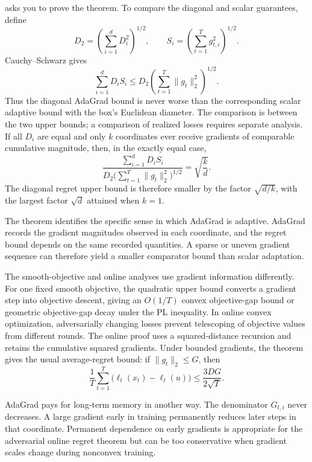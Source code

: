 \documentclass[11pt,twoside]{article}
\theoremstyle{definition}
\theoremstyle{remark}
\begin{document}
 asks you to prove the theorem. To compare the
diagonal and scalar guarantees, define
\[
 D_2=\left(\sum_{i=1}^dD_i^2\right)^{1/2},
 \qquad
 S_i=\left(\sum_{t=1}^Tg_{t,i}^2\right)^{1/2}.
\]
Cauchy--Schwarz gives
\begin{equation}
 \sum_{i=1}^dD_iS_i
 \le D_2\left(\sum_{t=1}^T\|g_t\|_2^2\right)^{1/2}.
 \label{eq:diagonal-versus-scalar}
\end{equation}
Thus the diagonal AdaGrad bound is never worse than the corresponding scalar
adaptive bound with the box's Euclidean diameter. The comparison is between
the two upper bounds; a comparison of realized losses requires separate
analysis. If all
$D_i$ are equal and only $k$ coordinates ever receive gradients of comparable
cumulative magnitude, then, in the exactly equal case,
\begin{equation}
 \frac{\sum_{i=1}^dD_iS_i}
 {D_2\bigl(\sum_{t=1}^T\|g_t\|_2^2\bigr)^{1/2}}
 =\sqrt{\frac{k}{d}}.
 \label{eq:adagrad-sparse-gain}
\end{equation}
The diagonal regret upper bound is therefore smaller by the factor
$\sqrt{d/k}$, with the largest factor $\sqrt d$ attained when $k=1$.

The theorem identifies the specific sense in which AdaGrad is adaptive.
AdaGrad records the gradient magnitudes observed in each coordinate, and the
regret bound depends on the same recorded quantities. A sparse or uneven
gradient sequence can therefore yield a smaller comparator bound than scalar
adaptation.

The smooth-objective and online analyses use gradient information
differently. For one fixed smooth objective, the quadratic upper bound
converts a gradient step into objective descent, giving an $O(1/T)$ convex
objective-gap bound or geometric objective-gap decay under the PL inequality.
In online convex optimization, adversarially changing losses prevent
telescoping of objective values from different rounds. The online proof uses a
squared-distance recursion and retains the cumulative squared gradients.
Under bounded gradients, the
theorem gives the usual average-regret bound: if $\|g_t\|_2\le G$, then
\begin{equation}
 \frac1T\sum_{t=1}^T\bigl(\ell_t(x_t)-\ell_t(u)\bigr)
 \le\frac{3DG}{2\sqrt T}.
 \label{eq:scalar-average-regret}
\end{equation}

AdaGrad pays for long-term memory in another way. The denominator
$G_{t,i}$ never decreases. A large gradient early in training permanently
reduces later steps in that coordinate. Permanent dependence on early
gradients is appropriate for the adversarial online regret theorem but can be
too conservative when gradient scales change during nonconvex training.
\end{document}
